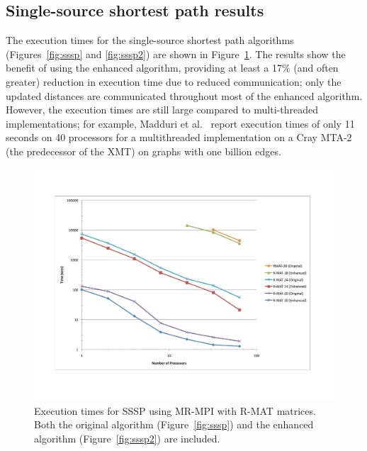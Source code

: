 \subsection{Single-source shortest path results}

The execution times for the single-source shortest path algorithms
(Figures~\ref{fig:sssp} and \ref{fig:sssp2}) are shown in
Figure~\ref{f:sssp}.  The results show the benefit of using the
enhanced algorithm, providing at least a 17\% (and often greater)
reduction in execution time due to reduced communication; only the
updated distances are communicated throughout most of the enhanced
algorithm.  However, the execution times are still large compared to
multi-threaded implementations; for example, Madduri et
al.~\cite{Madduri07} report execution times of only 11 seconds on 40
processors for a multithreaded implementation on a Cray MTA-2 (the
predecessor of the XMT) on graphs with one billion edges.

\begin{figure}[htb]
\includegraphics[width=\textwidth]{fig_sssp.pdf}
\caption{Execution times for SSSP using MR-MPI with R-MAT matrices.  
Both the original algorithm (Figure~\ref{fig:sssp}) and the enhanced 
algorithm (Figure~\ref{fig:sssp2}) are included.}
\label{f:sssp}
\end{figure}

